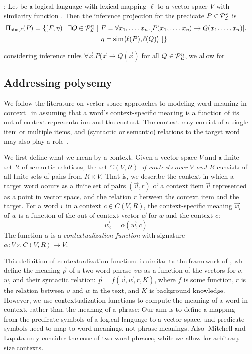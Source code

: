 : Let \loglang
be a logical language with lexical mapping $\ell$ to a vector space 
$V$ with similarity function \simfunc. Then the inference projection
for the predicate $P \in {\cal{P}}_{{\cal{L}}}^n$ is 
\begin{align*}
\Pi_{\mathrm{sim}, \ell}(P) = \{ (F, \eta) \mid \exists Q \in {\cal{P}}_{{\cal{L}}}^n~[ 
&~F = \forall x_1, \ldots, x_n.[P(x_1, \ldots, x_n) \to Q(x_1, \ldots, x_n)], \\
&~\eta = \mathrm{sim}\big(\ell(P), \ell(Q)\big) ~] \}
\end{align*}



considering inference rules $\forall \vec{x}.P(\vec{x} \to Q(\vec x)$
for all $Q \in {\cal{P}}_{{\cal{L}}}^n$, we allow for 




\subsection*{Addressing polysemy}

We follow the literature on vector space approaches to modeling word
meaning in
context~\citep{erk:emnlp08,ThaterFuerstenauPinkal:10,ReisingerMooney:10,dinu-lapata:2010:EMNLP,vandecruys:emnlp2011}
in assuming that a word's context-specific meaning is a function of its
out-of-context representation and the context. The context may consist
of a single item or multiple items, and (syntactic or semantic) relations to the
target word may also play a
role~\citep{erk:emnlp08,ThaterFuerstenauPinkal:10,vandecruys:emnlp2011}. 

We
first define what we mean by a context. Given a vector space $V$ and a
finite set $R$ of semantic relations, the set
\textit{$C(V, R)$ of contexts over $V$ and $R$} consists of all finite sets of
pairs from $R \times V$.  That is, we describe the context in which a
target word occurs as a finite set of pairs $(\vec v, r)$ of a context
item $\vec v$ represented as a point in vector space, and the relation $r$
between the context item and the target. 
For a word $v$ in a context $c
\in C(V, R)$, the context-specific meaning $\vec w_c$ of $w$ is a
function of the out-of-context vector $\vec w$ for $w$ and the context
$c$:
\[\vec w_c = \alpha(\vec w, c)\]
The function $\alpha$ is a \emph{contextualization function} with
signature $\alpha: V \times C(V, R) \to V$. 

This definition of contextualization functions is similar to the
framework of \citet{MitchellLapata:08}, wh define the meaning $\vec p$
of a two-word phrase $vw$ as a function of the vectors for $v$, $w$, and their
syntactic relation: $\vec p = f(\vec v, \vec w, r, K)$,  where $f$ is some function, $r$ is the
relation between $v$ and $w$ in the text, and $K$ is background
knowledge. However, we use contextualization functions to compute the meaning of a word in
context, rather than the meaning of a phrase: Our aim is to define a
mapping from the predicate symbols of a logical language to a vector
space, and predicate symbols need to map to word meanings, not phrase
meanings. Also, Mitchell and Lapata only consider the case of two-word
phrases, while we allow for arbitrary-size contexts. 


